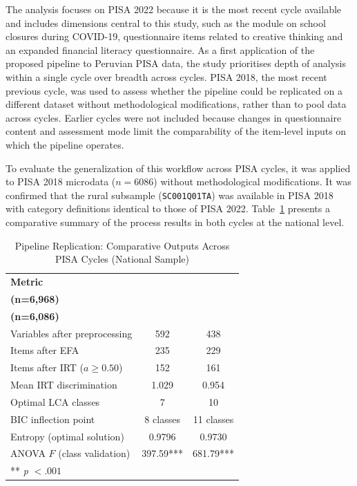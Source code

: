 \documentclass[runningheads]{llncs}
\begin{document}
The analysis focuses on PISA 2022 because it is the most recent
cycle available and includes dimensions central to this study,
such as the module on school closures during COVID-19,
questionnaire items related to creative thinking and an expanded
financial literacy questionnaire. As a first application of the
proposed pipeline to Peruvian PISA data, the study prioritises
depth of analysis within a single cycle over breadth across
cycles. PISA 2018, the most recent previous cycle, was used to
assess whether the pipeline could be replicated on a different
dataset without methodological modifications, rather than to
pool data across cycles. Earlier cycles were not included
because changes in questionnaire content and assessment mode
limit the comparability of the item-level inputs on which the
pipeline operates.

To evaluate the generalization of this workflow across PISA
cycles, it was applied to PISA 2018 microdata (\(n = 6086\))
without methodological modifications. It was confirmed that the
rural subsample (\texttt{SC001Q01TA}) was available in PISA 2018
with category definitions identical to those of PISA 2022.
Table~\ref{tab:replication} presents a comparative summary of
the process results in both cycles at the national level.

\begin{table}[!htbp]
\centering
\caption{Pipeline Replication: Comparative Outputs Across PISA
Cycles (National Sample)}
\label{tab:replication}
\begin{tabular}{lcc}
\toprule
\textbf{Metric} &
  \makecell{\textbf{PISA 2022} \\ \textbf{(n=6,968)}} &
  \makecell{\textbf{PISA 2018} \\ \textbf{(n=6,086)}} \\
\midrule
Variables after preprocessing  & 592    & 438    \\
Items after EFA                & 235    & 229    \\
Items after IRT ($a \geq 0.50$)& 152    & 161    \\
Mean IRT discrimination        & 1.029  & 0.954  \\
Optimal LCA classes            & 7      & 10     \\
BIC inflection point           & 8 classes & 11 classes \\
Entropy (optimal solution)     & 0.9796 & 0.9730 \\
ANOVA $F$ (class validation)   & 397.59*** & 681.79*** \\
\bottomrule
\multicolumn{3}{l}{\footnotesize *** \textit{p} $< .001$}
\end{tabular}
\end{table}
\end{document}
